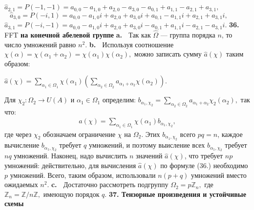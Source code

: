 \documentclass{../../template/mai_book}
\begin{document}
$\hat a_{2,1} = P(-1,-1) = a_{0,0} - a_{1,0} + a_{2,0} - a_{3,0} - a_{0,1} + a_{1,1} - a_{2,1} + a_{3,1},$ \newline \indent
$\;\;\:\hat a_{3,0} = P(-i,1) = a_{0,0} - a_{1,0}i + a_{2,0} + a_{3,0}i + a_{0,1} - a_{1,1}i + a_{2,1} + a_{3,1}i,$ \newline \indent
$\hat a_{3,1} = P(-i,-1) = a_{0,0} - a_{1,0}i + a_{2,0} + a_{3,0}i - a_{0,1} + a_{1,1}i - a_{2,1} - a_{3,1}i.$ \newline \newline
\textbf{36.} FFT \textbf{на конечной абелевой группе} \newline \newline \indent
\textbf{a.} $\;$ Так как $\hat \Omega$ --- группа порядка $n$, то число умножений равно $n^2.$ \newline \indent
\textbf{b.} $\;$ Используя соотношение $\chi (\alpha) = \chi (\alpha_1 + \alpha_2) = \chi (\alpha_1)\chi (\alpha_2),$ можно записать сумму $\hat a (\chi)$ таким образом:
\begin{center}
$\hat a (\chi) = \sum \limits_{\alpha_1 \in \Omega_1}\chi(\alpha_1)(\sum \limits_{\alpha_2 \in \Omega_2}a_{\alpha_1 + \alpha_2}\chi(\alpha_2)).$
\end{center} 
Для $\chi_2 : \Omega_2 \rightarrow U(A)$ и $\alpha_1 \in \Omega_1$ определим: $b_{\alpha_1 , \chi_2} = \sum_{\alpha_2 \in \Omega_2}a_{\alpha_1 + \alpha_2}\chi_2 (\alpha_2),$ так что: 
\begin{align}
\hat a (\chi) = \sum \limits_{\alpha_1 \in \Omega_1}\chi (\alpha_1)b_{\alpha_1 , \chi_2} \tag{13},
\end{align}
где через $\chi_2$ обозначаем ограничение $\chi$ на $\Omega_2$. Этих $b_{\alpha_1 , \chi_2}$ всего $pq = n$, каждое вычисление $b_{\alpha_1 , \chi_2}$ требует $q$ умножений, и поэтому выисление всех $b_{\alpha_1 , \chi_2}$ требует $nq$ умножений. Наконец, надо вычислить $n$ значений $\hat a (\chi)$, что требует $np$ умножений: действительно, для вычисления $\hat a (\chi)$ по формуле (36.) необходимо $p$ умножений. Всего, таким образом, использовали $n(p + q)$ умножений вместо ожидаемых $n^2$. \newline \indent
\textbf{c.} $\;$ Достаточно рассмотреть подгруппу $\Omega_2 = p \mathds{Z}_n,$ где $\mathds{Z}_n = \mathds{Z}/ n \mathds{Z},$ имеющую порядок $q.$ \newline \newline
\textbf{37. Тензорные произведения и устойчивые схемы} \newline \newline \indent
\end{document}
